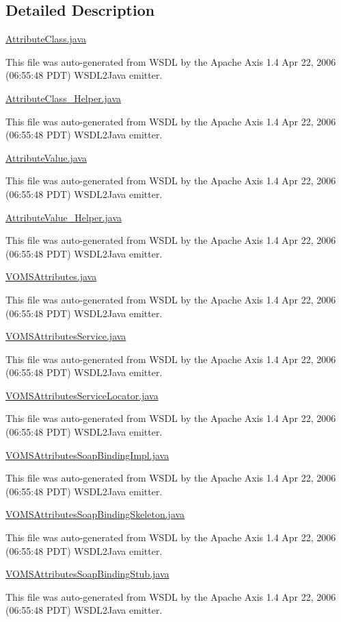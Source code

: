 \subsection{Detailed Description}
\hyperlink{AttributeClass_8java}{AttributeClass.java}

This file was auto-\/generated from WSDL by the Apache Axis 1.4 Apr 22, 2006 (06:55:48 PDT) WSDL2Java emitter.

\hyperlink{AttributeClass__Helper_8java}{AttributeClass\_\-Helper.java}

This file was auto-\/generated from WSDL by the Apache Axis 1.4 Apr 22, 2006 (06:55:48 PDT) WSDL2Java emitter.

\hyperlink{AttributeValue_8java}{AttributeValue.java}

This file was auto-\/generated from WSDL by the Apache Axis 1.4 Apr 22, 2006 (06:55:48 PDT) WSDL2Java emitter.

\hyperlink{AttributeValue__Helper_8java}{AttributeValue\_\-Helper.java}

This file was auto-\/generated from WSDL by the Apache Axis 1.4 Apr 22, 2006 (06:55:48 PDT) WSDL2Java emitter.

\hyperlink{VOMSAttributes_8java}{VOMSAttributes.java}

This file was auto-\/generated from WSDL by the Apache Axis 1.4 Apr 22, 2006 (06:55:48 PDT) WSDL2Java emitter.

\hyperlink{VOMSAttributesService_8java}{VOMSAttributesService.java}

This file was auto-\/generated from WSDL by the Apache Axis 1.4 Apr 22, 2006 (06:55:48 PDT) WSDL2Java emitter.

\hyperlink{VOMSAttributesServiceLocator_8java}{VOMSAttributesServiceLocator.java}

This file was auto-\/generated from WSDL by the Apache Axis 1.4 Apr 22, 2006 (06:55:48 PDT) WSDL2Java emitter.

\hyperlink{VOMSAttributesSoapBindingImpl_8java}{VOMSAttributesSoapBindingImpl.java}

This file was auto-\/generated from WSDL by the Apache Axis 1.4 Apr 22, 2006 (06:55:48 PDT) WSDL2Java emitter.

\hyperlink{VOMSAttributesSoapBindingSkeleton_8java}{VOMSAttributesSoapBindingSkeleton.java}

This file was auto-\/generated from WSDL by the Apache Axis 1.4 Apr 22, 2006 (06:55:48 PDT) WSDL2Java emitter.

\hyperlink{VOMSAttributesSoapBindingStub_8java}{VOMSAttributesSoapBindingStub.java}

This file was auto-\/generated from WSDL by the Apache Axis 1.4 Apr 22, 2006 (06:55:48 PDT) WSDL2Java emitter. 